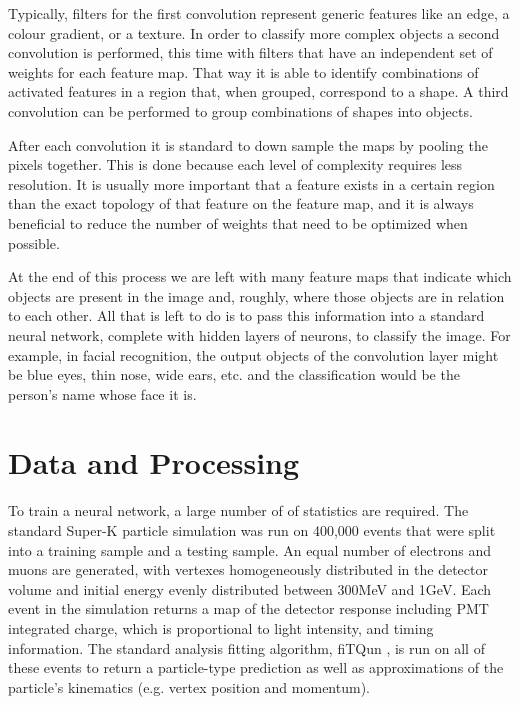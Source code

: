 \documentclass[twoside,twocolumn]{article}
\begin{document}
Typically, filters for the first convolution represent generic features like an edge, a colour gradient, or a texture. In order to classify more complex objects a second convolution is performed, this time with filters that have an independent set of weights for each feature map. That way it is able to identify combinations of activated features in a region that, when grouped, correspond to a shape. A third convolution can be performed to group combinations of shapes into objects.

After each convolution it is standard to down sample the maps by pooling the pixels together. This is done because each level of complexity requires less resolution. It is usually more important that a feature exists in a certain region than the exact topology of that feature on the feature map, and it is always beneficial to reduce the number of weights that need to be optimized when possible.

At the end of this process we are left with many feature maps that indicate which objects are present in the image and, roughly, where those objects are in relation to each other. All that is left to do is to pass this information into a standard neural network, complete with hidden layers of neurons, to classify the image. For example, in facial recognition, the output objects of the convolution layer might be blue eyes, thin nose, wide ears, etc. and the classification would be the person's name whose face it is.

\section{Data and Processing}

To train a neural network, a large number of of statistics are required. The standard Super-K particle simulation was run on 400,000 events that were split into a training sample and a testing sample. An equal number of electrons and muons are generated, with vertexes homogeneously distributed in the detector volume and initial energy evenly distributed between 300MeV and 1GeV. Each event in the simulation returns a map of the detector response including PMT integrated charge, which is proportional to light intensity, and timing information. The standard analysis fitting algorithm, fiTQun \cite{cite:fiTQun_poster} \cite{cite:fiTQun}, is run on all of these events to return a particle-type prediction as well as approximations of the particle's kinematics (e.g. vertex position and momentum).
\end{document}
